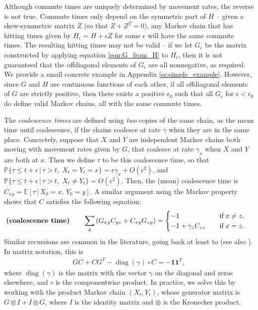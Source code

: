 \documentclass{article}
\DeclareMathOperator{\diag}{\mathop{\mbox{diag}}}
\renewcommand{\P}{\mathbb{P}}
\newcommand{\E}{\mathbb{E}}
\newcommand{\given}{\,\vert\,}
\newcommand{\bone}{\mathbf{1}}
\begin{document}
Although commute times are uniquely determined by movement rates, the reverse is not true.
Commute times only depend on the symmetric part of $H$ --
given a skew-symmetric matrix $Z$ (so that $Z + Z^T = 0$),
any Markov chain that has hitting times given by $H_\epsilon = H + \epsilon Z$ for some $\epsilon$
will have the same commute times.
The resulting hitting times may not be valid --
if we let $G_\epsilon$ be the matrix constructed by applying equation \eqref{eqn:G_from_H} to $H_\epsilon$,
then it is not guaranteed that the offdiagonal elements of $G_\epsilon$ are all nonnegative, as required.
We provide a small concrete example in Appendix \ref{ss:simple_example}.
However, since $G$ and $H$ are continuous functions of each other,
if all offdiagonal elements of $G$ are strictly positive,
then there exists a positive $\epsilon_0$ such that all $G_\epsilon$ for $\epsilon < \epsilon_0$
do define valid Markov chains, all with the same commute times.

The \emph{coalescence times} are defined using \emph{two} copies of the same chain,
as the mean time until coalescence,
if the chains coalesce at rate $\gamma$ when they are in the same place.
Concretely, 
suppose that $X$ and $Y$ are independent Markov chains both moving with movement rates given by $G$,
that coalesce at rate $\gamma_x$ when $X$ and $Y$ are both at $x$.
Then we define $\tau$ to be this coalescence time,
so that 
$\P\{\tau \le t + \epsilon \given \tau > t, \; X_t = Y_t = x\} = \epsilon \gamma_x + O(\epsilon^2)$,
and 
$\P\{\tau \le t + \epsilon \given \tau > t, \; X_t \neq Y_t\} = O(\epsilon^2)$.
Then, the (mean) coalescence time is $C_{xy} = \E[\tau \given X_0 = x, \, Y_0 = y]$.
A similar argument using the Markov property
shows that $C$ satisfies the following equation:
\begin{align}
\text{\bf (coalescence time)} \qquad
    \sum_y \left(G_{xy} C_{yz} + C_{xy} G_{zy}\right)
    &=
    \begin{cases}
        -1                   \quad & \text{if} \; x \neq z, \\
        -1 + \gamma_z C_{zz} \quad & \text{if} \; x = z.
    \end{cases}
\end{align}
Similar recursions are common in the literature,
going back at least to \citet{hill1972effective} (see also \citet{whitlock1997effective}).
In matrix notation, this is
\begin{align} \label{eqn:C_matrix}
    G C + C G^T - \diag(\gamma) \circ C = -\bone \bone^T,
\end{align}
where $\diag(\gamma)$ is the matrix with the vector $\gamma$ on the diagonal and zeros elsewhere,
and $\circ$ is the componentwise product.
In practice, we solve this by working with the product Markov chain $(X_t, Y_t)$,
whose generator matrix is $G \otimes I + I \otimes G$,
where $I$ is the identity matrix and $\otimes$ is the Kronecker product.
\end{document}
